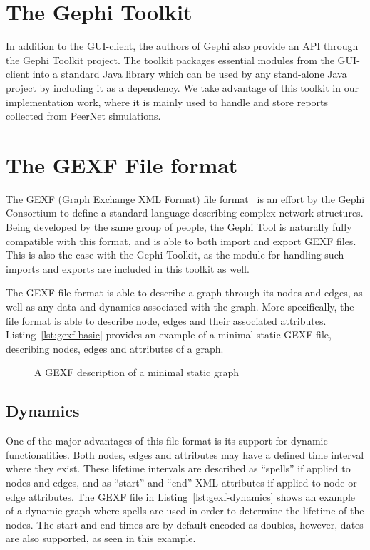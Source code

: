 \section{The Gephi Toolkit}

In addition to the GUI-client, the authors of Gephi also provide an API
through the Gephi Toolkit project. The toolkit packages essential
modules from the GUI-client into a standard Java library which can
be used by any stand-alone Java project by including it as a dependency.
We take advantage of this toolkit in our implementation work, where it
is mainly used to handle and store reports collected from PeerNet
simulations.

\section{The GEXF File format}

The GEXF (Graph Exchange XML Format) file format~\cite{gexf} is an
effort by the Gephi Consortium to define a standard language describing
complex network structures. Being developed by the same group of people,
the Gephi Tool is naturally fully compatible with this format, and is
able to both import and export GEXF files. This is also the case with
the Gephi Toolkit, as the module for handling such imports and exports
are included in this toolkit as well.

The GEXF file format is able to describe a graph through its nodes and
edges, as well as any data and dynamics associated with the graph. More
specifically, the file format is able to describe node, edges and their
associated attributes. Listing~\ref{lst:gexf-basic} provides an example
of a minimal static GEXF file, describing nodes, edges and attributes of
a graph.

\begin{figure}

\caption{A GEXF description of a minimal static graph}
\end{figure}

\subsection{Dynamics}

One of the major advantages of this file format is its support for
dynamic functionalities.  Both nodes, edges and attributes may have a
defined time interval where they exist. These lifetime intervals are
described as ``spells'' if applied to nodes and edges, and as ``start''
and ``end'' XML-attributes if applied to node or edge attributes. The
GEXF file in Listing~\ref{lst:gexf-dynamics} shows an example of a
dynamic graph where spells are used in order to determine the lifetime
of the nodes.  The start and end times are by default encoded as
doubles, however, dates are also supported, as seen in this example.

